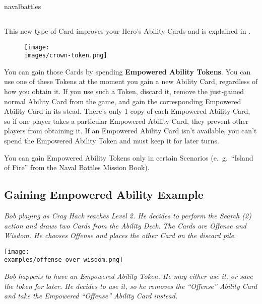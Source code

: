 \begin{expansion}{navalbattles}
\begin{multicols*}{2}
  \subsection*{}
  This new type of Card improves your Hero's Ability Cards and is explained in .

  \setlength\intextsep{0pt}
  \setlength\columnsep{1em}
  \begin{wrapfigure}{r}{0.2\linewidth}
    \texttt{[image: \\images/crown-token.png]}
  \end{wrapfigure}
  You can gain those Cards by spending \textbf{Empowered Ability Tokens}.
  You can use one of these Tokens at the moment you gain a new Ability Card, regardless of how you obtain it.
  If you use such a Token, discard it, remove the just-gained normal Ability Card from the game, and gain the corresponding Empowered Ability Card in its stead.
  There's only 1 copy of each Empowered Ability Card, so if one player takes a particular Empowered Ability Card, they prevent other players from obtaining it.
  If an Empowered Ability Card isn't available, you can't spend the Empowered Ability Token and must keep it for later turns.
  \vspace*{1em}

  You can gain Empowered Ability Tokens only in certain Scenarios (e.~g.~``Island of Fire'' from the Naval Battles Mission Book).\\

  \subsection*{Gaining Empowered Ability Example}
  \textit{Bob playing as Crag Hack reaches Level 2.
    He decides to perform the Search (2) action and draws two Cards from the Ability Deck.
    The Cards are Offense and Wisdom.
    He chooses Offense and places the other Card on the discard pile.}

  \begin{center}
    \texttt{[image: \\examples/offense\_over\_wisdom.png]}
  \end{center}

  \textit{Bob happens to have an Empowered Ability Token.
    He may either use it, or save the token for later.
    He decides to use it, so he removes the ``Offense'' Ability Card and take the Empowered ``Offense'' Ability Card instead.}


\end{multicols*}
\end{expansion}
